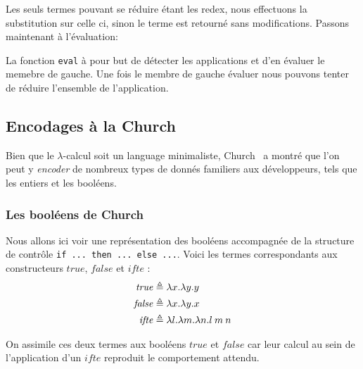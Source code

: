 \documentclass {article}
\newcommand{\codefrom}[3]
           {}
\theoremstyle{definition}
\theoremstyle{remark}
\newcommand{\fun}[1]{\lstinline!#1!}
\begin{document}
Les seuls termes pouvant se réduire étant les redex, nous effectuons la substitution sur celle ci,
sinon le terme est retourné sans modifications.
Passons maintenant à l'évaluation:

\codefrom{untyped}{lambda}{evaluation}
\codefrom{untyped}{lambda}{evaluation_bis}

La fonction \fun{eval} à pour but de détecter les applications et d'en évaluer le memebre de gauche.
Une fois le membre de gauche évaluer nous pouvons tenter de réduire l'ensemble de l'application.

\subsection{Encodages à la Church}

Bien que le $\lambda$-calcul soit un language minimaliste, Church~\citet{church:lambda-calcul} a montré que l'on peut
y \emph{encoder} de nombreux types de donnés familiers aux développeurs, tels que
les entiers et les booléens.


\subsubsection{Les booléens de Church}
\label{church-bool}

\newcommand{\True}{\ensuremath{\mathit{true}}}
\newcommand{\False}{\ensuremath{\mathit{false}}}
\newcommand{\Ifte}{\ensuremath{\mathit{ifte}}}

Nous allons ici voir une représentation des booléens accompagnée de la 
structure de contrôle \texttt{if ... then ... else ...}.
Voici les termes correspondants aux constructeurs \True{}, \False{} et 
\Ifte{} :
\begin{align*}
  \True &\triangleq  \Lam{x}{\Lam{y}{\Var{y}}} \\
  \False &\triangleq \Lam{x}{\Lam{y}{\Var{x}}} \\
  \Ifte &\triangleq \Lam{l}{\Lam{m}{\Lam{n}{\App{\Var{l}}{\App{\Var{m}}{\Var{n}}}}}}  \\
\end{align*}

On assimile ces deux termes aux booléens \True{} et \False{} car leur calcul au sein
de l'application d'un \Ifte{} reproduit le comportement attendu.
\end{document}
